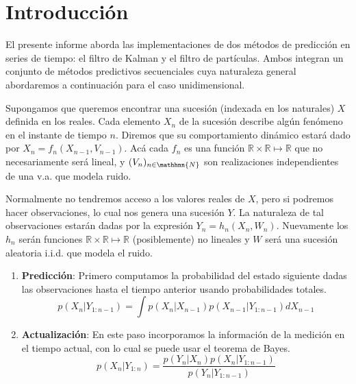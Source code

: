 \documentclass[letterpaper,11pt,oneside]{article}
\begin{document}
	





\inserttitle



\section{Introducción}
El presente informe aborda las implementaciones de dos métodos de predicción en series de tiempo: el filtro de Kalman y el filtro de partículas. Ambos integran un conjunto de métodos predictivos secuenciales cuya naturaleza general abordaremos a continuación para el caso unidimensional.

\newp Supongamos que queremos encontrar una sucesión (indexada en los naturales) $X$ definida en los reales. Cada elemento $X_n$ de la sucesión describe algún fenómeno en el instante de tiempo $n$. Diremos que su comportamiento dinámico estará dado por $ X_n = f_n(X_{n-1},V_{n-1})$. Acá cada $f_n$ es una función $\mathbb{R}\times\mathbb{R}\mapsto\mathbb{R}$ que no necesariamente será lineal, y $(V_n)_{n\in\mathhnn{N}}$ son realizaciones independientes de una v.a. que modela ruido. 

\newp Normalmente no tendremos acceso a los valores reales de $X$, pero si podremos hacer observaciones, lo cual nos genera una sucesión $Y$. La naturaleza de tal observaciones estarán dadas por la expresión  $ Y_n = h_n(X_n,W_n)$. Nuevamente los $h_n$ serán funciones $\mathbb{R}\times\mathbb{R}\mapsto\mathbb{R}$ (posiblemente) no lineales y $W$ será una sucesión aleatoria i.i.d. que modela el ruido. %

\begin{enumerate}
    \item \textbf{Predicción}: Primero computamos la probabilidad del estado siguiente dadas las observaciones hasta el tiempo anterior usando probabilidades totales.
    $$ p(X_n|Y_{1:n-1}) = \displaystyle \int p(X_n|X_{n-1})p(X_{n-1}|Y_{1:n-1})dX_{n-1}$$
    \item \textbf{Actualización}: En este paso incorporamos la información de la medición en el tiempo actual, con lo cual se puede usar el teorema de Bayes.
    $$ p(X_n|Y_{1:n}) = \frac{p(Y_n|X_{n})p(X_n|Y_{1:n-1})}{p(Y_n|Y_{1:n-1})}$$
\end{enumerate}
\end{document}
